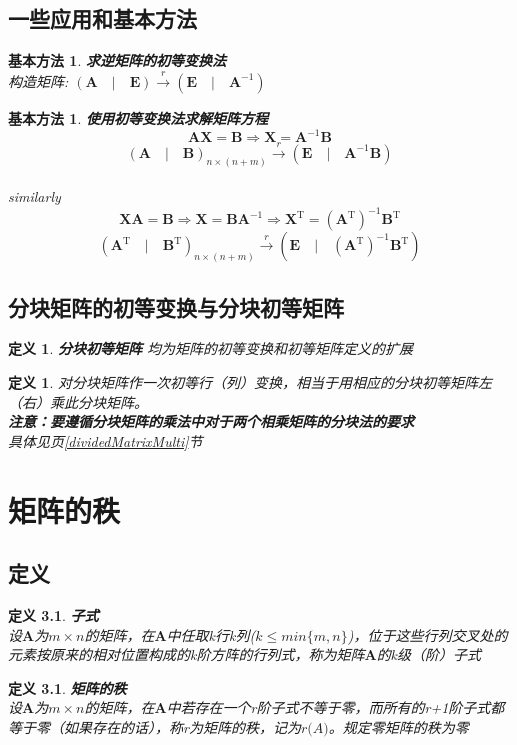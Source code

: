 \documentclass[12pt,oneside]{ctexbook}
\newtheorem{definition}[subsection]{定义}
\newtheorem{method}[subsection]{基本方法}
\begin{document}
\section{一些应用和基本方法}
\begin{method}
    \label{reverseMatrix}
    \textbf{求逆矩阵的初等变换法}
    \\构造矩阵:
    \((\mathbf{A}\quad|\quad\mathbf{E})\xrightarrow[]{r}(\mathbf{E}\quad|\quad\mathbf{A}^{-1})\)
\end{method}

\begin{method}
    \textbf{使用初等变换法求解矩阵方程}
    \[\mathbf{A}\mathbf{X}=\mathbf{B} \Rightarrow \mathbf{X}=\mathbf{A}^{-1}\mathbf{B}\]
    \[(\mathbf{A}\quad|\quad\mathbf{B})_{n\times (n+m)}\xrightarrow{r}(\mathbf{E}\quad|\quad\mathbf{A}^{-1}\mathbf{B})\]
    \\similarly
    \[\mathbf{X}\mathbf{A}=\mathbf{B} \Rightarrow \mathbf{X}=\mathbf{B}\mathbf{A}^{-1}\Rightarrow \mathbf{X}^\mathrm{T}=(\mathbf{A}^\mathrm{T})^{-1}\mathbf{B}^\mathrm{T} \]
    \[(\mathbf{A}^\mathrm{T}\quad|\quad\mathbf{B}^\mathrm{T})_{n\times (n+m)}\xrightarrow{r}(\mathbf{E}\quad|\quad(\mathbf{A}^\mathrm{T})^{-1}\mathbf{B}^\mathrm{T})\]
\end{method}

\section{分块矩阵的初等变换与分块初等矩阵}
\begin{definition}
    \textbf{分块初等矩阵}
    均为矩阵的初等变换和初等矩阵定义的扩展
\end{definition}
\begin{definition}
    对分块矩阵作一次初等行（列）变换，相当于用相应的分块初等矩阵左（右）乘此分块矩阵。
    \\ \textbf{注意：要遵循分块矩阵的乘法中对于两个相乘矩阵的分块法的要求}
    \\具体见\pageref{dividedMatrixMulti}页\ref{dividedMatrixMulti}节
\end{definition}


\chapter{矩阵的秩}
\section{定义}
\begin{definition}
    \textbf{子式}
    \\设\(\mathbf{A}\)为\(m \times n\)的矩阵，在\(\mathbf{A}\)中任取k行k列(\(k\leq min\{m,n\}\))，位于这些行列交叉处的元素按原来的相对位置构成的k阶方阵的行列式，称为矩阵\(\mathbf{A}\)的k级（阶）子式
\end{definition}
\begin{definition}
    \textbf{矩阵的秩}
    \\
    设\(\mathbf{A}\)为\(m \times n\)的矩阵，在\(\mathbf{A}\)中若存在一个r阶子式不等于零，而所有的r+1阶子式都等于零（如果存在的话），称r为矩阵的秩，记为\(r\mathbf(A)\)。规定零矩阵的秩为零
\end{definition}
\end{document}
